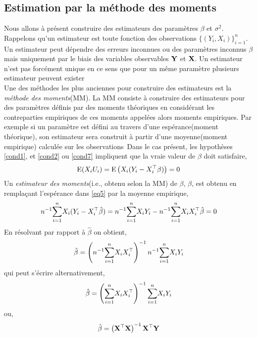 \subsection{Estimation par la méthode des moments}
Nous allons à présent construire des estimateurs des paramètres $\beta$ et $\sigma^2$. Rappelons qu'un estimateur est toute fonction des observations $\{(Y_i, X_i)\}_{i=1}^n$. Un estimateur peut dépendre des erreurs inconnues ou des paramètres inconnus $\beta$ mais uniquement par le biais des variables observables $\mathbf Y$ et $\mathbf X$. Un estimateur n'est pas forcément unique en ce sens que pour un même paramètre plusieurs estimateur peuvent exister\\
Une des méthodes les plus anciennes pour construire des estimateurs est la \emph{méthode des moments}(MM). La MM consiste à construire des estimateurs pour des paramètres définis par des moments théoriques en considérant les contreparties empiriques de ces moments appelées alors moments empiriques. Par exemple si un paramètre est défini au travers d'une espérance(moment théorique), son  estimateur sera construit à partir d'une moyenne(moment empirique) calculée sur les observations\
Dans le cas présent, les hypothèses \eqref{cond1}, et \eqref{cond2} ou \eqref{cond7} impliquent que la vraie valeur de $\beta$ doit satisfaire,
\begin{align}
\operatorname{E}(X_iU_i) = \operatorname{E}\left(X_i(Y_i-X_i^\top\beta)\right) = 0
\label{eq5}
\end{align}
 Un \emph{estimateur des moments}(i.e., obtenu selon la MM) de $\beta$, $\hat{\beta}$,  est obtenu en remplaçant l'espérance dans \eqref{eq5} par la moyenne empirique,
\begin{align}
n^{-1}\underset{i=1}{\overset{n}{\sum}} X_i(Y_i - X_i^\top\hat{\beta}) = n^{-1}\underset{i=1}{\overset{n}{\sum}} X_iY_i - n^{-1}\underset{i=1}{\overset{n}{\sum}} X_iX_i^\top\hat{\beta} = 0
\label{eq6}
\end{align}
En résolvant par rapport à $\hat{\beta}$ on obtient,
\begin{align}
\hat{\beta} = \left(n^{-1}\underset{i=1}{\overset{n}{\sum}} X_iX_i^\top\right)^{-1}n^{-1}\underset{i=1}{\overset{n}{\sum}} X_iY_i
\label{eq7}
\end{align}
qui peut s'écrire alternativement,
\begin{align}
\hat{\beta} = \left(\underset{i=1}{\overset{n}{\sum}} X_iX_i^\top\right)^{-1}\underset{i=1}{\overset{n}{\sum}} X_iY_i
\label{eq8}
\end{align}
ou,
\begin{align}
\hat{\beta} = \left(\mathbf X^\top\mathbf X\right)^{-1}\mathbf X^\top\mathbf Y
\label{eq9}
\end{align}
